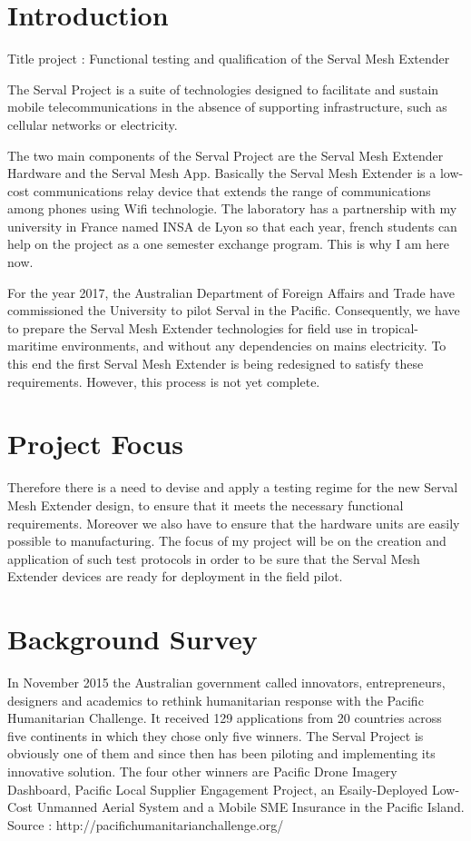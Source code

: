 \documentclass[a4paper, 11pt, oneside]{Thesis}  %
\begin{document}
\section{Introduction}
Title project : \Large Functional testing and qualification of the Serval Mesh Extender
\normalsize \par
The Serval Project is a suite of technologies designed to facilitate and sustain mobile telecommunications in the absence of supporting infrastructure, such as cellular networks or electricity. \par The two main components of the Serval Project are the Serval Mesh Extender Hardware and the Serval Mesh App. Basically the Serval Mesh Extender is a low-cost communications relay device that extends the range of communications among phones using Wifi technologie. The laboratory has a partnership with my university in France named INSA de Lyon so that each year, french students can help on the project as a one semester exchange program. This is why I am here now.  

For the year 2017, the Australian Department of Foreign Affairs and Trade have commissioned the University to pilot Serval in the Pacific. Consequently, we have to prepare the Serval Mesh Extender technologies for field use in tropical-maritime environments, and without any dependencies on mains electricity. To this end the first Serval Mesh Extender is being redesigned to satisfy these requirements. However, this process is not yet complete. \par

\section{Project Focus}

Therefore there is a need to devise and apply a testing regime for the new Serval Mesh Extender design, to ensure that it meets the necessary functional requirements. Moreover we also have to ensure that the hardware units are easily possible to manufacturing. The focus of my project will be on the creation and application of such test protocols in order to be sure that the Serval Mesh Extender devices are ready for deployment in the field pilot. 

\section{Background Survey}

In November 2015 the Australian government called innovators, entrepreneurs, designers and academics to rethink humanitarian response with the Pacific Humanitarian Challenge. It received 129 applications from 20 countries across five continents in which they chose only five winners. The Serval Project is obviously one of them and since then has been piloting and implementing its innovative solution. The four other winners are Pacific Drone Imagery Dashboard, Pacific Local Supplier Engagement Project, an Esaily-Deployed Low-Cost Unmanned Aerial System and a Mobile SME Insurance in the Pacific Island. Source : http://pacifichumanitarianchallenge.org/ 
\end{document}
